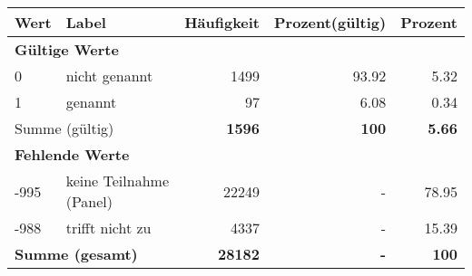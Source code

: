      \begin{longtable}{lXrrr}
     \toprule
     \textbf{Wert} & \textbf{Label} & \textbf{Häufigkeit} & \textbf{Prozent(gültig)} & \textbf{Prozent} \\
     \endhead
     \midrule
     \multicolumn{5}{l}{\textbf{Gültige Werte}}\\

     0 &
     \multicolumn{1}{X}{ nicht genannt   } &


       \num{1499} &
       \num[round-mode=places,round-precision=2]{93.92} &
         \num[round-mode=places,round-precision=2]{5.32} \\

     1 &
     \multicolumn{1}{X}{ genannt   } &


       \num{97} &
       \num[round-mode=places,round-precision=2]{6.08} &
         \num[round-mode=places,round-precision=2]{0.34} \\
     \midrule
     \multicolumn{2}{l}{Summe (gültig)} &
       \textbf{\num{1596}} &
     \textbf{\num{100}} &
       \textbf{\num[round-mode=places,round-precision=2]{5.66}} \\
     \multicolumn{5}{l}{\textbf{Fehlende Werte}}\\
       -995 &
       keine Teilnahme (Panel) &
         \num{22249} &
        - &
         \num[round-mode=places,round-precision=2]{78.95} \\
       -988 &
       trifft nicht zu &
         \num{4337} &
        - &
         \num[round-mode=places,round-precision=2]{15.39} \\
     \midrule
     \multicolumn{2}{l}{\textbf{Summe (gesamt)}} &
          \textbf{\num{28182}} &
        \textbf{-} &
        \textbf{\num{100}} \\
     \bottomrule
     \end{longtable}
     
